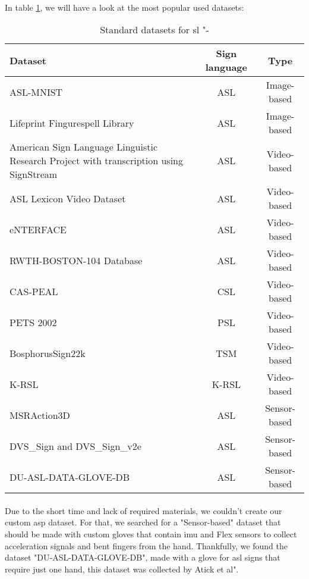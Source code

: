 \paragraph{}
In table \ref{tab:standard-datasets}, we will have a look at the most popular used datasets:
\begin{table}[h]
	\centering
	\caption{Standard datasets for \ac{sl} "\cite{state_of_the_art}-\cite{li2011framework}}
	\label{tab:standard-datasets}
	\begin{tabular}{|p{}|c|c|}
		\hline
		Dataset & Sign language & Type \\
		\hline
		ASL-MNIST & ASL & Image-based \\
		\hline
		Lifeprint Fingurespell Library & ASL & Image-based \\
		\hline
		American Sign Language Linguistic Research Project with transcription using SignStream & ASL & Video-based \\
		\hline
		ASL Lexicon Video Dataset & ASL & Video-based \\
		\hline
		eNTERFACE & ASL & Video-based \\
		\hline
		RWTH-BOSTON-104 Database & ASL & Video-based \\
		\hline
		CAS-PEAL & CSL & Video-based \\
		\hline
		PETS 2002 & PSL & Video-based \\
		\hline
		BosphorusSign22k & TSM & Video-based \\
		\hline
		K-RSL & K-RSL & Video-based \\
		\hline
		MSRAction3D & ASL & Sensor-based \\
		\hline
		DVS\_Sign and DVS\_Sign\_v2e & ASL & Sensor-based \\
		\hline
		DU-ASL-DATA-GLOVE-DB & ASL & Sensor-based \\
		\hline
	\end{tabular}
\end{table}
\paragraph{}
Due to the short time and lack of required materials, we couldn't create our custom \ac{asp} dataset. For that, we searched for a "Sensor-based" dataset that should be made with custom gloves that contain \ac{imu} and Flex sensors to collect acceleration signals and bent fingers from the hand. Thankfully, we found the dataset "DU-ASL-DATA-GLOVE-DB", made with a glove for \ac{asl} signs that require just one hand, this dataset was collected by Atick et al"\cite{ref-article}.